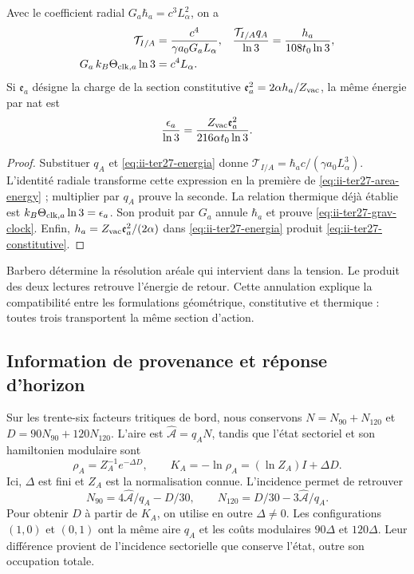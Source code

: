 \begin{proposition}
\label{prop:ii-ter27-area}
Avec le coefficient radial $G_a\hbar_a=c^3L_\alpha^2$, on a
\begin{align}
 \mathcal T_{I/A}&=\frac{c^4}{\gamma a_0G_aL_\alpha},&
 \frac{\mathcal T_{I/A}q_A}{\ln3}
 &=\frac{h_a}{108t_0\ln3},\label{eq:ii-ter27-area-energy}\\
 G_a\,k_B\Theta_{{\rm clk},a}\ln3&=c^4L_\alpha.&
 \label{eq:ii-ter27-grav-clock}
\end{align}
Si $\mathfrak e_a$ désigne la charge de la section constitutive
$\mathfrak e_a^2=2\alpha h_a/Z_{\rm vac}$, la même énergie par nat est
\begin{equation}
 \frac{\epsilon_a}{\ln3}
 =\frac{Z_{\rm vac}\mathfrak e_a^2}{216\alpha t_0\ln3}.
 \label{eq:ii-ter27-constitutive}
\end{equation}
\end{proposition}
\begin{proof}
Substituer $q_A$ et \eqref{eq:ii-ter27-energia} donne
$\mathcal T_{I/A}=\hbar_ac/(\gamma a_0L_\alpha^3)$.
L’identité radiale transforme cette expression en la première de
\eqref{eq:ii-ter27-area-energy} ; multiplier par $q_A$ prouve la seconde.
La relation thermique déjà établie est
$k_B\Theta_{{\rm clk},a}\ln3=\epsilon_a$.
Son produit par $G_a$ annule $\hbar_a$ et prouve
\eqref{eq:ii-ter27-grav-clock}. Enfin,
$h_a=Z_{\rm vac}\mathfrak e_a^2/(2\alpha)$ dans
\eqref{eq:ii-ter27-energia} produit \eqref{eq:ii-ter27-constitutive}.
\end{proof}

Barbero détermine la résolution aréale qui intervient dans la tension. Le
produit des deux lectures retrouve l’énergie de retour. Cette annulation
explique la compatibilité entre les formulations géométrique, constitutive
et thermique : toutes trois transportent la même section d’action.

\subsection{Information de provenance et réponse d’horizon}
\label{subsec:ii-termica-horizonte}

Sur les trente-six facteurs tritiques de bord, nous conservons
$N=N_{90}+N_{120}$ et $D=90N_{90}+120N_{120}$. L’aire est
$\widehat{\mathcal A}=q_AN$, tandis que l’état sectoriel et son
hamiltonien modulaire sont
\begin{equation}
 \rho_A=Z_A^{-1}e^{-\Delta D},\qquad
 K_A=-\ln\rho_A=(\ln Z_A)I+\Delta D.
 \label{eq:ii-ter27-modular}
\end{equation}
Ici, $\Delta$ est fini et $Z_A$ est la normalisation connue. L’incidence
permet de retrouver
\[
 N_{90}=4\widehat{\mathcal A}/q_A-D/30,\qquad
 N_{120}=D/30-3\widehat{\mathcal A}/q_A.
\]
Pour obtenir $D$ à partir de $K_A$, on utilise en outre $\Delta\ne0$.
Les configurations $(1,0)$ et $(0,1)$ ont la même aire $q_A$ et les coûts
modulaires $90\Delta$ et $120\Delta$. Leur différence provient de
l’incidence sectorielle que conserve l’état, outre son occupation totale.

